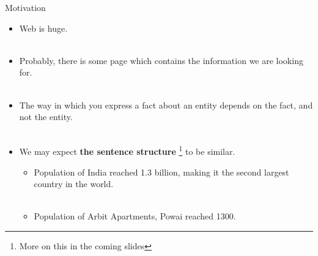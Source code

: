 \documentclass{beamer}
\begin{document}
\begin{frame}{Motivation}

\begin{itemize}
 \item  Web is huge.  \pause \\~\\
 \item Probably, there is some page which contains the information we are looking for. \pause \\~\\
 \item The way in which you express a fact about an entity depends on the fact, and not the entity. \pause \\~\\
 \item We may expect \textbf{the sentence structure} \footnote{More on this in the coming slides} to be similar. \pause
 \begin{itemize}
    \item Population of India reached 1.3 billion, making it the second largest country in the world. \pause \\~\\
    \item Population of Arbit Apartments, Powai reached 1300.
 \end{itemize}
 
\end{itemize}
\end{frame}
\end{document}
